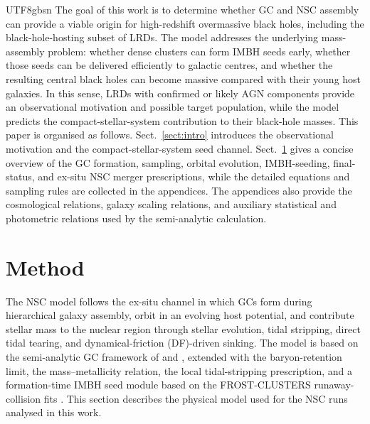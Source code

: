 \documentclass[trackchanges, twocolappendix, twocolumn]{aastex701}
\begin{document}
\begin{CJK*}{UTF8}{gbsn}
The goal of this work is to determine whether GC and NSC assembly can provide a viable origin for high-redshift overmassive black holes, including the black-hole-hosting subset of LRDs. The model addresses the underlying mass-assembly problem: whether dense clusters can form IMBH seeds early, whether those seeds can be delivered efficiently to galactic centres, and whether the resulting central black holes can become massive compared with their young host galaxies. In this sense, LRDs with confirmed or likely AGN components provide an observational motivation and possible target population, while the model predicts the compact-stellar-system contribution to their black-hole masses. This paper is organised as follows. Sect.~\ref{sect:intro} introduces the observational motivation and the compact-stellar-system seed channel. Sect.~\ref{sect:method} gives a concise overview of the GC formation, sampling, orbital evolution, IMBH-seeding, final-status, and ex-situ NSC merger prescriptions, while the detailed equations and sampling rules are collected in the appendices. The appendices also provide the cosmological relations, galaxy scaling relations, and auxiliary statistical and photometric relations used by the semi-analytic calculation.

\section{Method} \label{sect:method}

The NSC model follows the ex-situ channel in which GCs form during hierarchical galaxy assembly, orbit in an evolving host potential, and contribute stellar mass to the nuclear region through stellar evolution, tidal stripping, direct tidal tearing, and dynamical-friction (DF)-driven sinking. The model is based on the semi-analytic GC framework of \cite{Choksi+2018GC} and \cite{Gao+2024GC}, extended with the \cite{Chen&Gnedin2023GC} baryon-retention limit, the \cite{Chen&Gnedin2024aGC} mass--metallicity relation, the \cite{Fragione+2019GC} local tidal-stripping prescription, and a formation-time IMBH seed module based on the FROST-CLUSTERS runaway-collision fits \citep{Rantala+2024FROST, Rantala+2025FROST, Rantala+2026FROST}. This section describes the physical model used for the NSC runs analysed in this work.


\end{CJK*}
\end{document}
